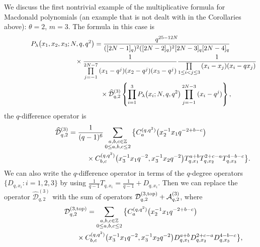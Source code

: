 \documentclass[pdftex]{sigma}
\numberwithin{equation}{section}
\newcommand{\Z}{\mathbb{Z}}
\newcommand{\AAA}{\mathcal{A}}
\newcommand{\DD}{\mathcal{D}}
\begin{document}
\begin{exam}\label{macdonaldmultiplicative}
We discuss the f\/irst nontrivial example of the multiplicative formula for Macdonald polynomials (an example that is not dealt with in the Corollaries above): $\theta = 2$, $m = 3$. The formula in this case is
\begin{gather*}
P_{\lambda}\big(x_1, x_2, x_3; N, q, q^2\big) = \frac{q^{25 - 12N}}{([2N - 1]_q)^2([2N - 2]_q)^2[2N - 3]_q[2N - 4]_q}\\
\hphantom{P_{\lambda}\big(x_1, x_2, x_3; N, q, q^2\big) =}{}
\times\frac{1}{\prod\limits_{j=-1}^{2N - 7}{(x_1 - q^j)(x_2 - q^j)(x_3 - q^j)}}
\frac{1}{\prod\limits_{1\leq i<j\leq 3}{(x_i - x_j)(x_i - qx_j)}}\\
\hphantom{P_{\lambda}\big(x_1, x_2, x_3; N, q, q^2\big) =}{}
\times\widehat{\DD}_{q, 2}^{(3)}\left\{ \prod_{i=1}^3{P_{\lambda}\big(x_i; N, q, q^2\big)\prod_{j=-1}^{2N - 3}{(x_i - q^j)}} \right\},
\end{gather*}
the $q$-dif\/ference operator is
\begin{gather*}
\widehat{\DD}_{q, 2}^{(3)} = \frac{1}{(q - 1)^{6}}\sum_{\substack{a, b, c\in\Z \\ 0\leq a, b, c\leq 2}}\big\{ C^{(q, q^2)}_a\big(x_2^{-1}x_1q^{-2 + b - c}\big)\\
\hphantom{\widehat{\DD}_{q, 2}^{(3)} = \frac{1}{(q - 1)^{6}}\sum_{\substack{a, b, c\in\Z \\ 0\leq a, b, c\leq 2}}}{} \times C^{(q, q^2)}_{b, c}\big(x_3^{-1}x_1q^{-2}, x_3^{-1}x_2q^{-2}\big) T_{q, x_1}^{a + b}T_{q, x_2}^{2 + c - a}T_{q, x_3}^{4 - b - c}\big\}.
\end{gather*}
We can also write the $q$-dif\/ference operator in terms of the $q$-degree operators $\{D_{q, x_i} \colon i = 1, 2, 3\}$ by using $\frac{1}{q - 1}T_{q, x_i} = \frac{1}{q - 1} + D_{q, x_i}$. Then we can replace the operator $\widehat{\DD}_{q, 2}^{(3)}$ with the sum of operators $\DD_{q, 2}^{(3, {\rm top})} + \AAA_{q, 2}^{(3)}$, where
\begin{gather*}
\DD_{q, 2}^{(3, {\rm top})} = \sum_{\substack{a, b, c\in\Z \\ 0\leq a, b, c\leq 2}}\big\{ C^{(q, q^2)}_a\big(x_2^{-1}x_1q^{-2 + b - c}\big)\\
\hphantom{\DD_{q, 2}^{(3, {\rm top})} = \sum_{\substack{a, b, c\in\Z \\ 0\leq a, b, c\leq 2}}}{}
 \times C^{(q, q^2)}_{b, c}\big(x_3^{-1}x_1q^{-2}, x_3^{-1}x_2q^{-2}\big) D_{q, x_1}^{a + b} D_{q, x_2}^{2 + c - a} D_{q, x_3}^{4 - b - c}\big\},\\

\end{gather*}
\end{exam}
\end{document}
